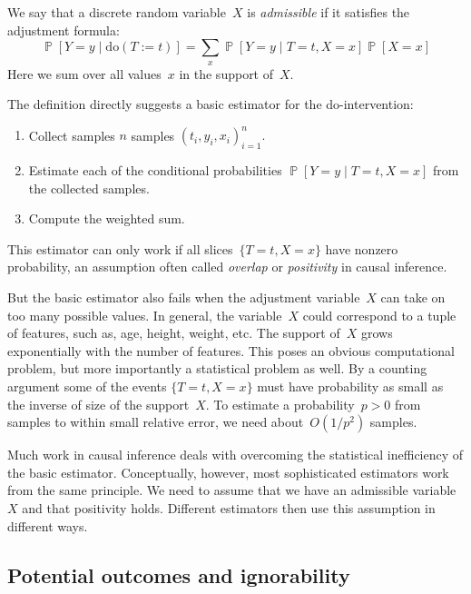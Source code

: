 \documentclass{tufte-book}
\begin{document}
\begin{Definition}

We say that a discrete random variable~\(X\) is \emph{admissible} if it
satisfies the adjustment formula: \[
\mathop\mathbb{P}[Y=y\mid \mathrm{do}(T:=t)] = \sum_x \mathop\mathbb{P}[Y=y\mid T=t, X=x] \mathop\mathbb{P}[X=x]
\] Here we sum over all values~\(x\) in the support of~\(X\).

\end{Definition}

The definition directly suggests a basic estimator for the
do-intervention:

\begin{enumerate}
\def\labelenumi{\arabic{enumi}.}
\tightlist
\item
  Collect samples \(n\) samples \((t_i, y_i, x_i)_{i=1}^n.\)
\item
  Estimate each of the conditional probabilities
  \(\mathop\mathbb{P}[Y=y\mid T=t,X=x]\) from the collected samples.
\item
  Compute the weighted sum.
\end{enumerate}

This estimator can only work if all slices~\(\{T=t,X=x\}\) have nonzero
probability, an assumption often called \emph{overlap} or
\emph{positivity} in causal inference.

But the basic estimator also fails when the adjustment variable~\(X\)
can take on too many possible values. In general, the variable~\(X\)
could correspond to a tuple of features, such as, age, height, weight,
etc. The support of~\(X\) grows exponentially with the number of
features. This poses an obvious computational problem, but more
importantly a statistical problem as well. By a counting argument some
of the events \(\{T=t,X=x\}\) must have probability as small as the
inverse of size of the support~\(X\). To estimate a probability~\(p>0\)
from samples to within small relative error, we need about~\(O(1/p^2)\)
samples.

Much work in causal inference deals with overcoming the statistical
inefficiency of the basic estimator. Conceptually, however, most
sophisticated estimators work from the same principle. We need to assume
that we have an admissible variable~\(X\) and that positivity holds.
Different estimators then use this assumption in different ways.

\hypertarget{potential-outcomes-and-ignorability}{%
\subsection{Potential outcomes and
ignorability}\label{potential-outcomes-and-ignorability}}
\end{document}
